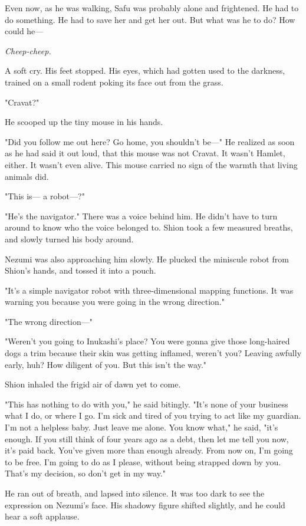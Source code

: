 Even now, as he was walking, Safu was probably alone and frightened. He
had to do something. He had to save her and get her out. But what was he
to do? How could he---

\emph{Cheep-cheep.}

A soft cry. His feet stopped. His eyes, which had gotten used to the
darkness, trained on a small rodent poking its face out from the grass.

"Cravat?"

He scooped up the tiny mouse in his hands.

"Did you follow me out here? Go home, you shouldn't be---" He realized as
soon as he had said it out loud, that this mouse was not Cravat. It
wasn't Hamlet, either. It wasn't even alive. This mouse carried no sign
of the warmth that living animals did.

"This is--- a robot---?"

"He's the navigator." There was a voice behind him. He didn't have to
turn around to know who the voice belonged to. Shion took a few measured
breaths, and slowly turned his body around.

Nezumi was also approaching him slowly. He plucked the miniscule robot
from Shion's hands, and tossed it into a pouch.

"It's a simple navigator robot with three-dimensional mapping functions.
It was warning you because you were going in the wrong direction."

"The wrong direction---"

"Weren't you going to Inukashi's place? You were gonna give those
long-haired dogs a trim because their skin was getting inflamed, weren't
you? Leaving awfully early, huh? How diligent of you. But this isn't the
way."

Shion inhaled the frigid air of dawn yet to come.

"This has nothing to do with you," he said bitingly. "It's none of your
business what I do, or where I go. I'm sick and tired of you trying to
act like my guardian. I'm not a helpless baby. Just leave me alone. You
know what," he said, "it's enough. If you still think of four years ago
as a debt, then let me tell you now, it's paid back. You've given more
than enough already. From now on, I'm going to be free. I'm going to do
as I please, without being strapped down by you. That's my decision, so
don't get in my way."

He ran out of breath, and lapsed into silence. It was too dark to see
the expression on Nezumi's face. His shadowy figure shifted slightly,
and he could hear a soft applause.


